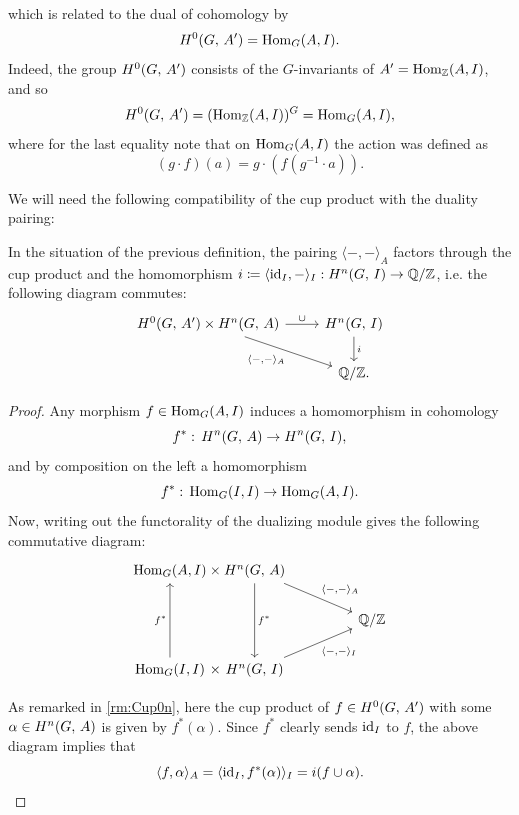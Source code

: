 \documentclass[a4paper, oneside]{memoir}
\begin{document}
which is related to the dual of cohomology by
\[
	H^{0}( G, \, A^{\prime} ) = \operatorname{Hom}_G(A,I).
\]
Indeed, the group \(H^{0}( G, \, A^{\prime}  )\) consists of the \(G\)-invariants of \(A^{\prime} = \operatorname{Hom}_{\mathbb{Z}}(A,I)\), and so
\[
	H^{0}( G, \, A^{\prime} ) = (\operatorname{Hom}_{\mathbb{Z}}(A,I))^G = \operatorname{Hom}_G(A,I),
\]
where for the last equality note that on $\operatorname{Hom}_G(A,I)$ the action was defined as
\[
	(g\cdot f)(a)=g\cdot(f(g^{-1}\cdot a)).
\]

We will need the following compatibility of the cup product with the duality pairing:

\begin{lemma}\label{lm:CompatCupDual}
	In the situation of the previous definition, the pairing \(\langle-,- \rangle_A\) factors through the cup product and the homomorphism \(i\coloneqq \langle \operatorname{id}_I,-\rangle_I: H^{n}( G, \, I )\to \mathbb{Q}/\mathbb{Z}\), i.e. the following diagram commutes:
	\[
		\begin{tikzcd}
			{\H{0}{G}{A^\prime}  \times \H{n}{G}{A}} \ar[swap, rd, "\langle - {,} - \rangle_A "] \ar[r, "\cup"] & \H{n}{G}{I} \ar[d, "i"] \\
			& \Q/\Z.
		\end{tikzcd}
	\]
\end{lemma}

\begin{proof}
	Any morphism \(f\in\operatorname{Hom}_G(A,I)\) induces a homomorphism in cohomology
	\[
		f^*:\, H^{n}( G, \, A )\to H^{n}( G, \, I ),
	\]
	and by composition on the left a homomorphism
	\[
		f^*:\, \operatorname{Hom}_G(I,I)\to\operatorname{Hom}_G(A,I)
		.\]
	Now, writing out the functorality of the dualizing module gives the following commutative diagram:
	\[
		\tikzset{
			symbol/.style={
					draw=none,
					every to/.append style={
							edge node={node [sloped, allow upside down, auto=false]{$#1$}}}
				}
		}
		\begin{tikzcd}
			\Hom_G(A,I) \arrow[r,symbol=\times] &[-2em] \ar[dd, "f^*"] \H{n}{G}{A} \ar[rd, "\langle - {,} - \rangle_A "] &[2em] \\
			&& \Q/\Z \\
			\Hom_G(I,I)  \arrow[r,symbol=\times] \ar[uu, "f^*"] & \H{n}{G}{I}  \ar[swap, ru, "\langle - {,} - \rangle_I "]
		\end{tikzcd}
	\]

	As remarked in \ref{rm:Cup0n}, here the cup product of \(f\in H^{0}( G, \, A^{\prime} )\) with some \(\alpha\in H^{n}( G, \, A )\) is given by
	\( f^*(\alpha) \). Since \(f^*\) clearly sends \(\operatorname{id}_I\) to \(f\), the above diagram implies that
	\[
		\langle f, \alpha \rangle_A = \langle \operatorname{id}_I, f^*(\alpha)\rangle_I=i(f\cup\alpha).
	\]
\end{proof}
\end{document}
